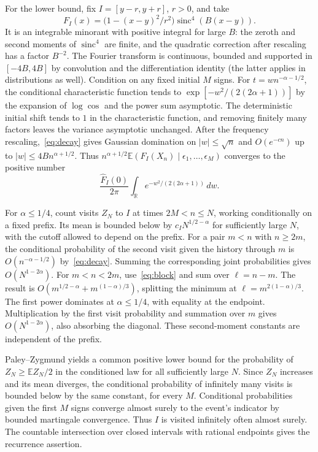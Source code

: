 \documentclass[a4paper,11pt]{amsart}
\DeclareMathOperator{\sinc}{sinc}
\newcommand{\EE}{\mathbb E}
\begin{document}
For the lower bound, fix $I=[y-r,y+r]$, $r>0$, and take
\[
 F_I(x)=\bigl(1-(x-y)^2/r^2\bigr)\sinc^4(B(x-y)).
\]
It is an integrable minorant with positive integral for large $B$: the zeroth and second moments of $\sinc^4$ are finite, and the quadratic correction after rescaling has a factor $B^{-2}$. The Fourier transform is continuous, bounded and supported in $[-4B,4B]$ by convolution and the differentiation identity (the latter applies in distributions as well). Condition on any fixed initial $M$ signs. For $t=w n^{-\alpha-1/2}$, the conditional characteristic function tends to $\exp[-w^2/(2(2\alpha+1))]$ by the expansion of $\log\cos$ and the power sum asymptotic. The deterministic initial shift tends to $1$ in the characteristic function, and removing finitely many factors leaves the variance asymptotic unchanged. After the frequency rescaling,~\eqref{eq:decay} gives Gaussian domination on $|w|\le\sqrt n$ and $O(e^{-cn})$ up to $|w|\le4B n^{\alpha+1/2}$. Thus $n^{\alpha+1/2}\EE(F_I(X_n)\mid\epsilon_1,\ldots,\epsilon_M)$ converges to the positive number
\[
 \frac{\widehat F_I(0)}{2\pi}\int_{\mathbb R}
 e^{-w^2/(2(2\alpha+1))}\,dw.
\]

For $\alpha\le1/4$, count visits $Z_N$ to $I$ at times $2M<n\le N$, working conditionally on a fixed prefix. Its mean is bounded below by $c_I N^{1/2-\alpha}$ for sufficiently large $N$, with the cutoff allowed to depend on the prefix. For a pair $m<n$ with $n\ge 2m$, the conditional probability of the second visit given the history through $m$ is $O(n^{-\alpha-1/2})$ by~\eqref{eq:decay}. Summing the corresponding joint probabilities gives $O(N^{1-2\alpha})$. For $m<n<2m$, use~\eqref{eq:block} and sum over $\ell=n-m$. The result is $O(m^{1/2-\alpha}+m^{(1-\alpha)/3})$, splitting the minimum at $\ell=m^{2(1-\alpha)/3}$. The first power dominates at $\alpha\le1/4$, with equality at the endpoint. Multiplication by the first visit probability and summation over $m$ gives $O(N^{1-2\alpha})$, also absorbing the diagonal. These second-moment constants are independent of the prefix.

Paley--Zygmund yields a common positive lower bound for the probability of $Z_N\ge \EE Z_N/2$ in the conditioned law for all sufficiently large $N$. Since $Z_N$ increases and its mean diverges, the conditional probability of infinitely many visits is bounded below by the same constant, for every $M$. Conditional probabilities given the first $M$ signs converge almost surely to the event's indicator by bounded martingale convergence. Thus $I$ is visited infinitely often almost surely. The countable intersection over closed intervals with rational endpoints gives the recurrence assertion.
\end{document}
